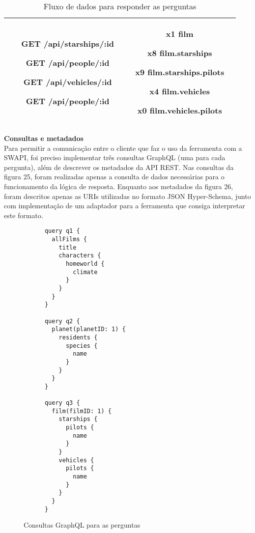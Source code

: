 \begin{table}[H]
\begin{tabular}{|c|c|c|}
\begin{minipage}[t]{0.3\textwidth}
\begin{itemize}
        \item[\textbf{GET}] /api/starships/:id
        \item[\textbf{GET}] /api/people/:id
        \item[\textbf{GET}] /api/vehicles/:id
        \item[\textbf{GET}] /api/people/:id
      \end{itemize}
    \end{minipage} & \begin{minipage}[t]{0.5\textwidth}
      \begin{itemize}
        \item[\textbf{x1}] film
        \item[\textbf{x8}] film.starships
        \item[\textbf{x9}] film.starships.pilots
        \item[\textbf{x4}] film.vehicles
        \item[\textbf{x0}] film.vehicles.pilots
      \end{itemize}
    \end{minipage} \\
    \hline
  \end{tabular}
  \caption{Fluxo de dados para responder as perguntas}
\end{table}

\textbf{Consultas e metadados} \\

Para permitir a comunicação entre o cliente que faz o uso da ferramenta com a SWAPI, foi preciso implementar três consultas GraphQL (uma para cada pergunta), além de descrever os metadados da API REST. Nas consultas da figura 25, foram realizadas apenas a consulta de dados necessárias para o funcionamento da lógica de resposta. Enquanto aos metadados da figura 26, foram descritos apenas as URIs utilizadas no formato JSON Hyper-Schema, junto com implementação de um adaptador para a ferramenta que consiga interpretar este formato.

\begin{figure}[H]
  \centering
  \begin{verbatim}
      query q1 {
        allFilms {
          title
          characters {
            homeworld {
              climate
            }
          }
        }
      }

      query q2 {
        planet(planetID: 1) {
          residents {
            species {
              name
            }
          }
        }
      }

      query q3 {
        film(filmID: 1) {
          starships {
            pilots {
              name
            }
          }
          vehicles {
            pilots {
              name
            }
          }
        }
      }
  \end{verbatim}
  \caption{Consultas GraphQL para as perguntas}
\end{figure}

